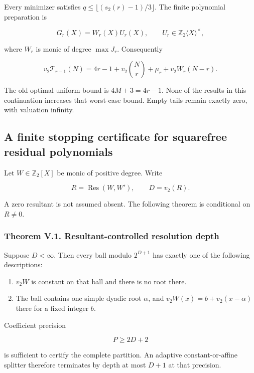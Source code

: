 \documentclass[11pt,letterpaper]{article}
\providecommand{\tightlist}{\setlength{\itemsep}{0pt}\setlength{\parskip}{0pt}}
\begin{document}
Every minimizer satisfies \(q\le\lfloor(s_2(r)-1)/3\rfloor\). The finite polynomial preparation is

\[
G_r(X)=W_r(X)U_r(X),\qquad
U_r\in\mathbb Z_2\langle X\rangle^\times,
\]

where \(W_r\) is monic of degree \(\max J_r\). Consequently

\[
\boxed{
 v_2\mathcal T_{r-1}(N)
 =4r-1+v_2\binom Nr+\mu_r+v_2W_r(N-r).
} \tag{V.1}
\]

The old optimal uniform bound is \(4M+3=4r-1\). None of the results in this continuation increases that worst-case bound. Empty tails remain exactly zero, with valuation infinity.

\subsection{A finite stopping certificate for squarefree residual polynomials}\label{a-finite-stopping-certificate-for-squarefree-residual-polynomials}

Let \(W\in\mathbb Z_2[X]\) be monic of positive degree. Write

\[
R=\operatorname{Res}(W,W'),\qquad D=v_2(R).
\]

A zero resultant is not assumed absent. The following theorem is conditional on \(R\ne0\).

\subsubsection{Theorem V.1. Resultant-controlled resolution depth}\label{theorem-v.1.-resultant-controlled-resolution-depth}

Suppose \(D<\infty\). Then every ball modulo \(2^{D+1}\) has exactly one of the following descriptions:

\begin{enumerate}
\def\labelenumi{\arabic{enumi}.}
\tightlist
\item
  \(v_2W\) is constant on that ball and there is no root there.
\item
  The ball contains one simple dyadic root \(\alpha\), and \(v_2W(x)=b+v_2(x-\alpha)\) there for a fixed integer \(b\).
\end{enumerate}

Coefficient precision

\[
\boxed{P\ge2D+2}
\]

is sufficient to certify the complete partition. An adaptive constant-or-affine splitter therefore terminates by depth at most \(D+1\) at that precision.
\end{document}
